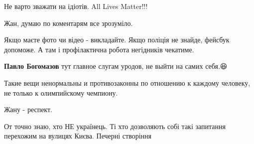 \begin{itemize}
 

Не варто зважати на ідіотів. All Lives Matter!!!


 

Жан, думаю по коментарям все зрозуміло\Smiley[1.0][yellow].

Якщо маєте фото чи відео - викладайте. Якщо поліція не знайде, фейсбук
допоможе. А там і профілактична робота негідників чекатиме.

\begin{itemize}
 
\textbf{Павло Богомазов} тут главное слугам уродов, не выйти на самих себя.😆
\end{itemize}

 
Такие вещи ненормальны и противозаконны по отношению к каждому человеку, не
только к олимпийскому чемпиону.

 

Жану - респект.

От точно знаю, хто НЕ українець. Ті хто дозволяють собі такі запитання
перехожим на вулицях Києва. Печерні створіння 🙁


 


\end{itemize}
